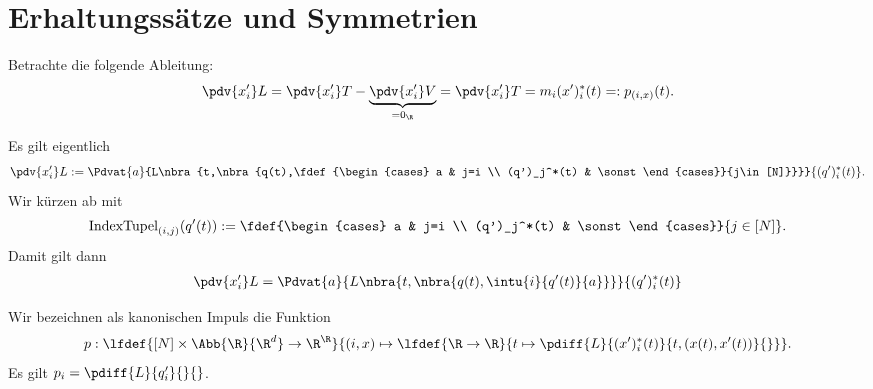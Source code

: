 \documentclass[../WiSe22ANA3.tex]{subfiles}
\begin{document}
		\section{Erhaltungssätze und Symmetrien}
			Betrachte die folgende Ableitung:
			\begin{align*}
				\pdv{x'_i}L=\pdv{x'_i}T-\underbrace{\pdv{x'_i}V}_{=0_\R}=\pdv{x'_i}T=m_i(x')_i^*(t)=:p_{(i,x)}(t).  
			\end{align*}
			\begin{hintergrund}
				Es gilt eigentlich
				\begin{align*}
					\pdv{x'_i}L:=\Pdvat{a}{L\nbra{t,\nbra{q(t),\fdef{\begin{cases}
					a & j=i \\
					(q')_j^*(t) & \sonst
				\end{cases}}{j\in[N]}}}}{(q')_i^*(t)}.
				\end{align*}
				Wir kürzen ab mit
				\begin{align*}
					\text{IndexTupel}_{(i,j)}(q'(t)):=\fdef{\begin{cases}
					a & j=i \\
					(q')_j^*(t) & \sonst
				\end{cases}}{j\in[N]}. 
				\end{align*}
				Damit gilt dann
				\begin{align*}
					\pdv{x'_i}L=\Pdvat{a}{L\nbra{t,\nbra{q(t),\intu{i}{q'(t)}{a}}}}{(q')_i^*(t)}
				\end{align*}
			\end{hintergrund}
			\begin{info}
				Wir bezeichnen als kanonischen Impuls die Funktion
				\begin{align*}
					p:\lfdef{[N]\times\Abb{\R}{\R^d}\to \R^\R}{(i,x)\mapsto \lfdef{\R\to\R}{t\mapsto \pdiff{L}{(x')_i^*(t)}{t,(x(t),x'(t))}{}}}.
				\end{align*}
				Es gilt $p_i=\pdiff{L}{q'_i}{}{}$.
			\end{info}
\end{document}

